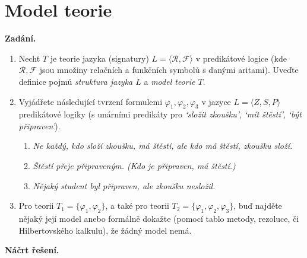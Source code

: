 \section{Model teorie}

\noindent\textbf{Zadání.}\par

\begin{enumerate}
  \item Nechť $T$ je teorie jazyka (signatury) $L = \langle \mathcal{R}, \mathcal{F} \rangle$ v predikátové logice (kde $\mathcal{R}, \mathcal{F}$ jsou množiny relačních a funkčních symbolů s danými aritami). Uveďte definice pojmů \emph{struktura jazyka $L$} a \emph{model teorie $T$}.

  \item Vyjádřete následující tvrzení formulemi $\varphi_1, \varphi_2, \varphi_3$ v jazyce $L = \langle Z, S, P \rangle$ predikátové logiky (s unárními predikáty pro \emph{`složit zkoušku'}, \emph{`mít štěstí'}, \emph{`být připraven'}).
  \begin{enumerate}
    \item[(a)] \emph{Ne každý, kdo složí zkoušku, má štěstí, ale kdo má štěstí, zkoušku složí.}
    \item[(b)] \emph{Štěstí přeje připraveným. (Kdo je připraven, má štěstí.)}
    \item[(c)] \emph{Nějaký student byl připraven, ale zkoušku nesložil.}
  \end{enumerate}

  \item Pro teorii $T_1 = \{\varphi_1, \varphi_2\}$, a také pro teorii $T_2 = \{\varphi_1, \varphi_2, \varphi_3\}$, buď najděte nějaký její model anebo formálně dokažte (pomocí tablo metody, rezoluce, či Hilbertovského kalkulu), že žádný model nemá.
\end{enumerate}

\medskip
\noindent\textbf{Náčrt řešení.}\par

